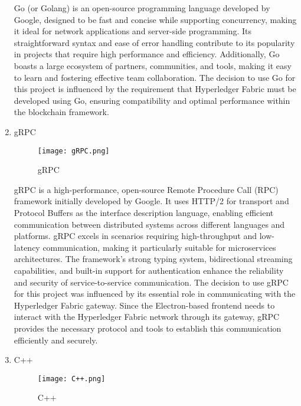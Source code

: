 \documentclass[conference]{IEEEtran}
\begin{document}
\begin{enumerate}[itemsep=2ex, parsep=1ex]
	      Go (or Golang) is an open-source programming language developed by Google,
	      designed to be fast and concise while supporting concurrency, making it
	      ideal for network applications and server-side programming. Its straightforward
	      syntax and ease of error handling contribute to its popularity in projects
	      that require high performance and efficiency. Additionally, Go boasts a large
	      ecosystem of partners, communities, and tools, making it easy to learn and
	      fostering effective team collaboration. The decision to use Go for this project
	      is influenced by the requirement that Hyperledger Fabric must be developed
	      using Go, ensuring compatibility and optimal performance within the
	      blockchain framework.
	      	      
	\item gRPC
	      	      
	      \begin{figure}[h!]
	      	\centering
	      	\texttt{[image: gRPC.png]}
	      	\caption{gRPC}
	      	\label{fig:gRPC}
	      \end{figure}
	      	      
	      gRPC is a high-performance, open-source Remote Procedure Call (RPC) framework
	      initially developed by Google. It uses HTTP/2 for transport and Protocol
	      Buffers as the interface description language, enabling efficient communication
	      between distributed systems across different languages and platforms. gRPC
	      excels in scenarios requiring high-throughput and low-latency
	      communication, making it particularly suitable for microservices architectures.
	      The framework's strong typing system, bidirectional streaming capabilities,
	      and built-in support for authentication enhance the reliability and
	      security of service-to-service communication. The decision to use gRPC for
	      this project was influenced by its essential role in communicating with the
	      Hyperledger Fabric gateway. Since the Electron-based frontend needs to
	      interact with the Hyperledger Fabric network through its gateway, gRPC provides
	      the necessary protocol and tools to establish this communication efficiently
	      and securely.
	      
	      \vspace{5cm}
	                 
	\item C++
	      	      
	      \begin{figure}[h!]
	      	\centering
	      	\texttt{[image: C++.png]}
	      	\caption{C++}
	      	\label{fig:C++}
	      \end{figure}
	      	      

\end{enumerate}
\end{document}
